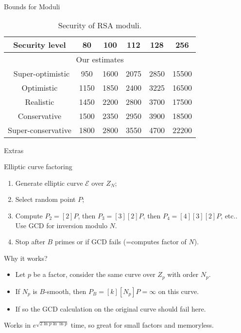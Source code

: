 \documentclass[t]{beamer}
\begin{document}
\begin{frame}{Bounds for Moduli}
    \begin{table}[t]
    \centering
    \begin{tabular}{|c|c|c|c|c|c|}
        \hline 
        Security level &80 & 100 & 112 & 128 & 256   \\
        \hline\hline
        \multicolumn{6}{|c|}{Our estimates}\\\hline\
        Super-optimistic & 950 & 1600 & 2075 & 2850 &15500\\
        Optimistic& 1150 & 1850 & 2400 & 3225 & 16500\\
        Realistic & 1450 &2200 & 2800& 3700 & 17500\\
        Conservative & 1500 & 2350&2950& 3900 & 18500\\
        Super-conservative& 1800 & 2800 &3550& 4700 & 22200\\         \hline\hline
     
    \end{tabular}
    \caption{Security of RSA moduli.}
    \label{tab:sec}
\end{table}
\end{frame}


\begin{frame}[c]
\begin{center}
    \Large{Extras}
    \end{center}
\end{frame}

\begin{frame}{Elliptic curve factoring}
\begin{enumerate}
    \item Generate elliptic curve $\mathcal{E}$ over $Z_N$;
    \item Select random point $P$;
    \item Compute $P_2=[2]P$, then $P_3=[3][2]P$, then $P_4=[4][3][2]P$, etc.. Use GCD for inversion modulo $N$.
    \item Stop after $B$ primes or if GCD fails (=computes factor of $N$).
\end{enumerate}
Why it works?
\begin{itemize}
    \item Let $p$ be a factor, consider the same curve over $Z_p$ with order $N_p$.
    \item If $N_p$ is $B$-smooth, then $P_B = [k][N_p]P = \infty$ on this curve.
    \item If so the GCD calculation on the original curve should fail here.
\end{itemize}
        Works in $e^{\sqrt{2\ln p\ln\ln p}}$ time, so great for small factors and memoryless.
\end{frame}
\end{document}
